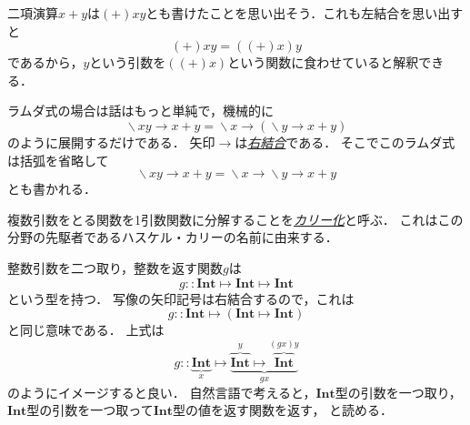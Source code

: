 \documentclass[a5paper,draft]{jsbook}
\newcommand{\keyword}[1]{{\underline{\emph{#1}}}}
\newcommand{\mathTypeName}[1]{\mathbf{#1}}
\DeclareMathOperator{\mathLambda}{\backslash}
\newcommand{\mathIn}{\mathrel{::}}
\newcommand{\mathLambdaArrow}{\rightarrow}
\newcommand{\mathMapsTo}{\mapsto}
\newcommand{\mathLambdaExpression}[2]{\mathLambda#1\mathLambdaArrow#2}
\newcommand{\mathMorphII}[3]{#1\mathMapsTo#2\mathMapsTo#3}
\newcommand{\mathMorphIIWithParenthesis}[3]{#1\mathMapsTo(#2\mathMapsTo#3)}
\begin{document}
二項演算$x+y$は$(+)xy$とも書けたことを思い出そう．これも左結合を思い出すと
\begin{equation}
(+)xy=\left((+)x\right)y
\end{equation}
であるから，$y$という引数を$\left((+)x\right)$という関数に食わせていると解釈できる．

ラムダ式の場合は話はもっと単純で，機械的に
\begin{equation}
\mathLambdaExpression{xy}{x+y}
=\mathLambdaExpression{x}{\left(\mathLambdaExpression{y}{x+y}\right)}
\end{equation}
のように展開するだけである．
矢印$\mathLambdaArrow$は\keyword{右結合}である．
そこでこのラムダ式は括弧を省略して
\begin{equation}
\mathLambdaExpression{xy}{x+y}=\mathLambdaExpression{x}{\mathLambdaExpression{y}{x+y}}
\end{equation}
とも書かれる．

複数引数をとる関数を1引数関数に分解することを\keyword{カリー化}と呼ぶ．
これはこの分野の先駆者であるハスケル・カリーの名前に由来する．


整数引数を二つ取り，整数を返す関数$g$は
\begin{equation}
g\mathIn\mathMorphII{\mathTypeName{Int}}{\mathTypeName{Int}}{\mathTypeName{Int}}
\end{equation}
という型を持つ．
写像の矢印記号は右結合するので，これは
\begin{equation}
g\mathIn\mathMorphIIWithParenthesis{\mathTypeName{Int}}{\mathTypeName{Int}}{\mathTypeName{Int}}
\end{equation}
と同じ意味である．
上式は
\begin{equation*}
g\mathIn
\underbrace{\mathTypeName{Int}}_x
\mathMapsTo
\underbrace{\overbrace{\mathTypeName{Int}}^y
\mathMapsTo\overbrace{\mathTypeName{Int}}^{(gx)y}}_{gx}
\end{equation*}
のようにイメージすると良い．
自然言語で考えると，$\mathTypeName{Int}$型の引数を一つ取り，
$\mathTypeName{Int}$型の引数を一つ取って$\mathTypeName{Int}$型の値を返す関数を返す，
と読める．
\end{document}
